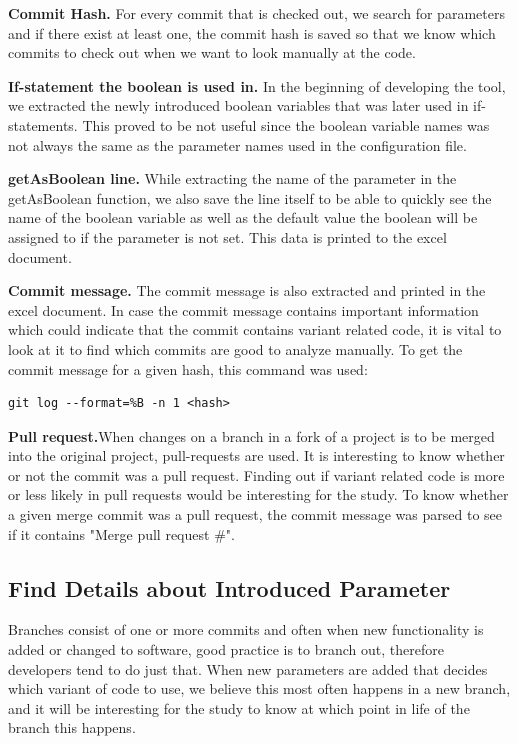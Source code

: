 \textbf{Commit Hash.} For every commit that is checked out, we search for parameters and if there exist at least one, the commit hash is saved so that we know which commits to check out when we want to look manually at the code.

\textbf{If-statement the boolean is used in.} In the beginning of developing the tool, we extracted the newly introduced boolean variables that was later used in if-statements. This proved to be not useful since the boolean variable names was not always the same as the parameter names used in the configuration file.

\textbf{getAsBoolean line.} While extracting the name of the parameter in the getAsBoolean function, we also save the line itself to be able to quickly see the name of the boolean variable as well as the default value the boolean will be assigned to if the parameter is not set. This data is printed to the excel document.

\textbf{Commit message.} The commit message is also extracted and printed in the excel document. In case the commit message contains important information which could indicate that the commit contains variant related code, it is vital to look at it to find which commits are good to analyze manually.
To get the commit message for a given hash, this command was used:
\lstset{language=Bash}
\begin{lstlisting}[frame=single]
git log --format=%B -n 1 <hash>
\end{lstlisting}

\textbf{Pull request.}When changes on a branch in a fork of a project is to be merged into the original project, pull-requests are used. It is interesting to know whether or not the commit was a pull request. Finding out if variant related code is more or less likely in pull requests would be interesting for the study. To know whether a given merge commit was a pull request, the commit message was parsed to see if it contains "Merge pull request \#".
\subsection{Find Details about Introduced Parameter}
Branches consist of one or more commits and often when new functionality is added or changed to software, good practice is to branch out, therefore developers tend to do just that. When new parameters are added that decides which variant of code to use, we believe this most often happens in a new branch, and it will be interesting for the study to know at which point in life of the branch this happens.

